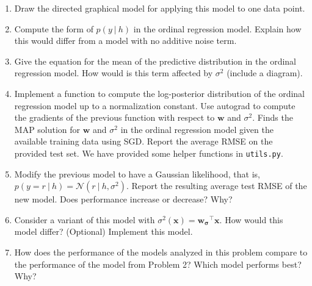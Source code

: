 \documentclass[10pt]{harvardml}
\theoremstyle{plain}
\begin{document}
\begin{problem}
\begin{enumerate}
\vspace{-0.1cm}
~

\item Draw the directed graphical model for applying this model to one data point.

\item Compute the form of  $p(y\ |\ h)$ in the ordinal regression model. Explain
  how this would differ from a model with no additive noise term.

\vspace{-0.1cm}


\item Give the equation for the mean of the predictive distribution in the ordinal regression model.
How would is this term affected by $\sigma^2$ (include a diagram).

\vspace{-0.1cm}
\item Implement a function to compute the log-posterior distribution of the ordinal
regression model up to a normalization constant. Use autograd to compute
the gradients of the previous function with respect to $\mathbf{w}$ and
$\sigma^2$. Finds the MAP solution for $\mathbf{w}$ and
  $\sigma^2$ in the ordinal regression model given the available
  training data using SGD. Report the average RMSE on the provided test set. We have provided some helper
  functions in \texttt{utils.py}.



\vspace{-0.1cm}
\item Modify the previous model to have a Gaussian likelihood, that
  is, $p(y=r\ |\ h)=\mathcal{N}(r\ | \ h,\sigma^2)$. Report the resulting
  average test RMSE of the new model. Does performance increase or
  decrease? Why?  \vspace{-0.1cm}

\vspace{-0.1cm}
\item Consider a variant of this model with
  $\sigma^2(\mathbf{x}) = \mathbf{w_{\sigma}}^\top \mathbf{x}$. How would this
  model differ? (Optional) Implement this model.

\vspace{-0.1cm}
\item How does the performance of the models analyzed in this problem
  compare to the performance of the model from Problem 2? Which model
  performs best? Why?

\end{enumerate}
\end{problem}
\end{document}
